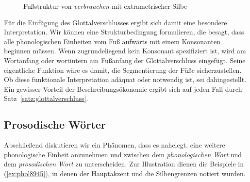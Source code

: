 \begin{figure}
	\centering
	\label{fig:verbrauchen}
	\caption{Fußstruktur von \textit{verbrauchen} mit extrametrischer Silbe}
\end{figure}

Für die Einfügung des Glottalverschlusses ergibt sich damit eine besondere Interpretation.
Wir können eine Strukturbedingung formulieren, die besagt, dass alle phonologischen Einheiten vom Fuß aufwärts mit einem Konsonanten beginnen müssen.
Wenn zugrundeliegend kein Konsonant spezifiziert ist, wird am Wortanfang oder wortintern am Fußanfang der Glottalverschluss eingefügt.
Seine eigentliche Funktion wäre es damit, die Segmentierung der Füße sicherzustellen.
Ob diese funktionale Interpretation adäquat oder notwendig ist, sei dahingestellt.
Ein gewisser Vorteil der Beschreibungsökonomie ergibt sich auf jeden Fall durch Satz~\ref{satz:glottalverschluss}.


\subsection{Prosodische Wörter}

\label{sec:prosodischewoerter}

Abschließend diskutieren wir ein Phänomen, dass es nahelegt, eine weitere phonologische Einheit anzunehmen und zwischen dem \textit{phonologischen Wort} und dem \textit{prosodischen Wort} zu unterscheiden.
Zur Illustration dienen die Beispiele in (\ref{ex:phol8945}), in denen der Hauptakzent und die Silbengrenzen notiert wurden.

